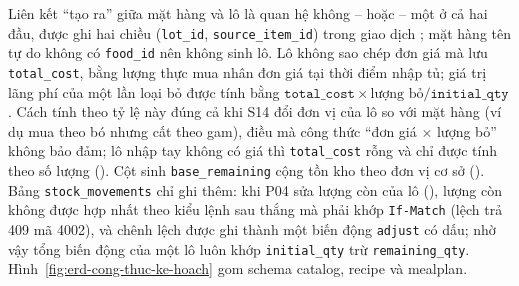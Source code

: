 
Liên kết “tạo ra” giữa mặt hàng và lô là quan hệ không -- hoặc -- một ở cả hai đầu, được ghi hai chiều (\texttt{lot\_id}, \texttt{source\_item\_id}) trong giao dịch ; mặt hàng tên tự do không có \texttt{food\_id} nên không sinh lô. Lô không sao chép đơn giá mà lưu \texttt{total\_cost}, bằng lượng thực mua nhân đơn giá tại thời điểm nhập tủ; giá trị lãng phí của một lần loại bỏ được tính bằng $\texttt{total\_cost} \times \text{lượng bỏ} / \texttt{initial\_qty}$. Cách tính theo tỷ lệ này đúng cả khi S14 đổi đơn vị của lô so với mặt hàng (ví dụ mua theo bó nhưng cất theo gam), điều mà công thức “đơn giá $\times$ lượng bỏ” không bảo đảm; lô nhập tay không có giá thì \texttt{total\_cost} rỗng và chỉ được tính theo số lượng (). Cột sinh \texttt{base\_remaining} cộng tồn kho theo đơn vị cơ sở (). Bảng \texttt{stock\_movements} chỉ ghi thêm: khi P04 sửa lượng còn của lô (), lượng còn không được hợp nhất theo kiểu lệnh sau thắng mà phải khớp \texttt{If-Match} (lệch trả 409 mã 4002), và chênh lệch được ghi thành một biến động \texttt{adjust} có dấu; nhờ vậy tổng biến động của một lô luôn khớp \texttt{initial\_qty} trừ \texttt{remaining\_qty}. Hình~\ref{fig:erd-cong-thuc-ke-hoach} gom schema catalog, recipe và mealplan.



